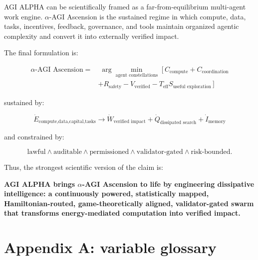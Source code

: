 \documentclass[
  11pt,
]{article}
\begin{document}
AGI ALPHA can be scientifically framed as a far-from-equilibrium
multi-agent work engine. $\alpha$-AGI Ascension is the sustained regime in
which compute, data, tasks, incentives, feedback, governance, and tools
maintain organized agentic complexity and convert it into externally
verified impact.

The final formulation is:

\[
\boxed{
\begin{aligned}
\alpha\text{-AGI Ascension}
=&\;\arg\min_{\text{agent constellations}}\;[\,C_{\text{compute}}+C_{\text{coordination}}\\
&+R_{\text{safety}}-V_{\text{verified}}-T_{\text{eff}}S_{\text{useful exploration}}\,]
\end{aligned}}
\]

sustained by:

\[
\boxed{
\dot{E}_{\text{compute,data,capital,tasks}}
\rightarrow
\dot{W}_{\text{verified impact}}
+
\dot{Q}_{\text{dissipated search}}
+
\dot{I}_{\text{memory}}
}
\]

and constrained by:

\[
\boxed{
\text{lawful}\land\text{auditable}\land\text{permissioned}\land\text{validator-gated}\land\text{risk-bounded}.
}
\]

Thus, the strongest scientific version of the claim is:

\textbf{AGI ALPHA brings $\alpha$-AGI Ascension to life by engineering
dissipative intelligence: a continuously powered, statistically mapped,
Hamiltonian-routed, game-theoretically aligned, validator-gated swarm
that transforms energy-mediated computation into verified impact.}

\section{Appendix A: variable
glossary}\label{appendix-a-variable-glossary}
\end{document}
